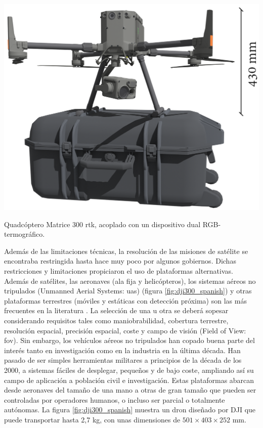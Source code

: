 \begin{marginfigure}[.7cm]
	\includegraphics{figs/introduction/dji300.png}
	\caption{Quadcóptero Matrice 300 \acrshort{rtk}, acoplado con un dispositivo dual RGB-termográfico. }
	\label{fig:dji300_spanish}
\end{marginfigure}
Además de las limitaciones técnicas, la resolución de las misiones de satélite se encontraba restringida hasta hace muy poco por algunos gobiernos. Dichas restricciones y limitaciones propiciaron el uso de plataformas alternativas. Además de satélites, las aeronaves (ala fija y helicópteros), los sistemas aéreos no tripulados (Unmanned Aerial Systems: \acrshort{uas}) (figura \ref{fig:dji300_spanish}) y otras plataformas terrestres (móviles y estáticas con detección próxima) son las más frecuentes en la literatura \cite{lillesand_remote_2015}. La selección de una u otra se deberá sopesar considerando requisitos tales como maniobrabilidad, cobertura terrestre, resolución espacial, precisión espacial, coste y campo de visión (Field of View: \acrshort{fov}). Sin embargo, los vehículos aéreos no tripulados han copado buena parte del interés tanto en investigación como en la industria en la última década. Han pasado de ser simples herramientas militares a principios de la década de los 2000, a sistemas fáciles de desplegar, pequeños y de bajo coste, ampliando así su campo de aplicación a población civil e investigación. Estas plataformas abarcan desde aeronaves del tamaño de una mano a otras de gran tamaño que pueden ser controladas por operadores humanos, o incluso ser parcial o totalmente autónomas. La figura \ref{fig:dji300_spanish} muestra un dron diseñado por DJI que puede transportar hasta 2,7 \si{\kilo\gram}, con unas dimensiones de $501 \times 403 \times 252$ \si{\milli\meter}.

